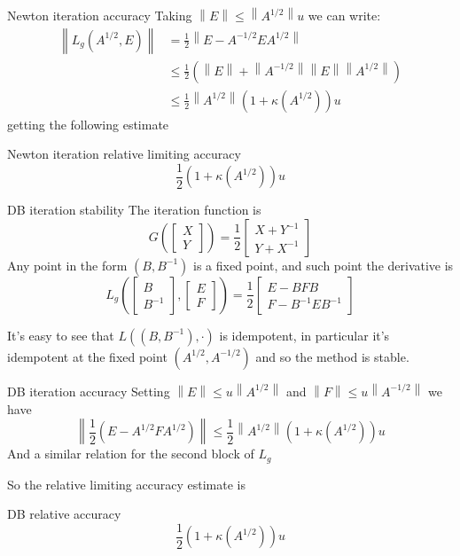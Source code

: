 \documentclass{beamer}
\theoremstyle{plain}
\theoremstyle{definition}
\theoremstyle{remark}
\newcommand{\pa}[1]{\left(#1\right)}
\newcommand{\bra}[1]{\left[#1\right]}
\newcommand{\norm}[1]{\left\|#1\right\|}
\begin{document}
\begin{frame}{Newton iteration accuracy}
  Taking $\norm{E} \le \norm{A^{1/2}} u$ we can write:
  \begin{align*}
    \norm{L_g\pa{A^{1/2},E}} &= \frac{1}{2}\norm{E-A^{-1/2}EA^{1/2}} \\
      &\le \frac{1}{2}\pa{\norm{E} +
        \norm{A^{-1/2}}\norm{E}\norm{A^{1/2}}} \\
    & \le \frac{1}{2}\norm{A^{1/2}}\pa{1+\kappa\pa{A^{1/2}}}u
  \end{align*}
  getting the following estimate
  \begin{block}{Newton iteration relative limiting accuracy}
    \[ \frac{1}{2}\pa{1+\kappa\pa{A^{1/2}}}u \]
  \end{block}
\end{frame}

\begin{frame}{DB iteration stability}
  The iteration function is
  \[ G\pa{\bra{\begin{matrix}X\\Y\end{matrix}}} = \frac{1}{2}\bra{
      \begin{matrix}
        X+Y^{-1} \\
        Y+X^{-1}
      \end{matrix}
    } \]
  Any point in the form $\pa{B,B^{-1}}$ is a fixed point, and such
  point the derivative is
  \[ L_g\pa{ \bra{ \begin{matrix}B\\B^{-1}\end{matrix}},
      \bra{\begin{matrix}E\\F\end{matrix}}} = \frac{1}{2}
    \bra{\begin{matrix} E-BFB \\ F-B^{-1}EB^{-1}\end{matrix}} \]

  It's easy to see that $L\pa{ \pa{B,B^{-1}}, \cdot}$ is idempotent,
  in particular it's idempotent at the fixed point $\pa{A^{1/2},A^{-1/2}}$
  and so the method is stable.
\end{frame}

\begin{frame}{DB iteration accuracy}
  Setting $\norm{E} \le u\norm{A^{1/2}}$ and $\norm{F} \le
  u\norm{A^{-1/2}}$ we have
  \[ \norm{\frac{1}{2}\pa{E-A^{1/2}FA^{1/2}}} \le
    \frac{1}{2}\norm{A^{1/2}}\pa{1+ \kappa\pa{A^{1/2}}}u \]
  And a similar relation for the second block of $L_g$
  \vfill

  So the relative limiting accuracy estimate is
  \begin{block}{DB relative accuracy}
    \[ \frac{1}{2}\pa{ 1 + \kappa\pa{A^{1/2}}}u \]
  \end{block}
\end{frame}
\end{document}
